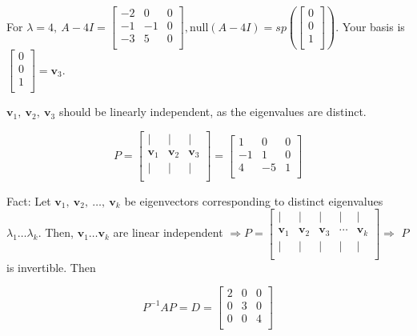 \documentclass[
]{article}
\begin{document}
For $\lambda = 4,\ A - 4I = \begin{bmatrix}
 - 2 & 0 & 0 \\
 - 1 & - 1 & 0 \\
 - 3 & 5 & 0 \\
\end{bmatrix},\text{null}(A - 4I) = sp\left( \begin{bmatrix}
0 \\
0 \\
1 \\
\end{bmatrix} \right)$. Your basis is $\begin{bmatrix}
0 \\
0 \\
1 \\
\end{bmatrix} = {\mathbf{v}}_{3}$.

${\mathbf{v}}_{1},\ {\mathbf{v}}_{2},\ {\mathbf{v}}_{3}$
should be linearly independent, as the eigenvalues are distinct.

$$P = \begin{bmatrix}
 \mid & \mid & \mid \\
{\mathbf{v}}_{1} & {\mathbf{v}}_{2} & {\mathbf{v}}_{3} \\
 \mid & \mid & \mid \\
\end{bmatrix} = \begin{bmatrix}
1 & 0 & 0 \\
 - 1 & 1 & 0 \\
4 & - 5 & 1 \\
\end{bmatrix}$$

Fact: Let
${\mathbf{v}}_{1},\ {\mathbf{v}}_{2},\ \ldots,\ {\mathbf{v}}_{k}$
be eigenvectors corresponding to distinct eigenvalues
$\lambda_{1}\ldots\lambda_{k}$. Then,
${\mathbf{v}}_{1}\ldots{\mathbf{v}}_{k}$ are linear
independent $\Rightarrow P = \begin{bmatrix}
 \mid & \mid & \mid & \mid & \mid \\
{\mathbf{v}}_{1} & {\mathbf{v}}_{2} & {\mathbf{v}}_{3} & \cdots & {\mathbf{v}}_{k} \\
 \mid & \mid & \mid & \mid & \mid \\
\end{bmatrix} \Rightarrow$ $P$ is invertible. Then

$$P^{- 1}AP = D = \begin{bmatrix}
2 & 0 & 0 \\
0 & 3 & 0 \\
0 & 0 & 4 \\
\end{bmatrix}$$
\end{document}

